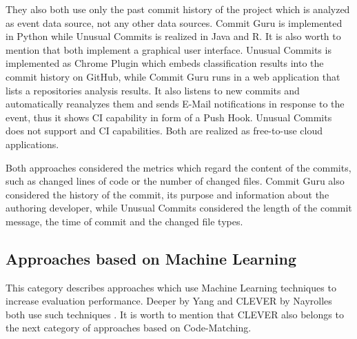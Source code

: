 They also both use only the past commit history of the project which is analyzed as event data source, not any other data sources. Commit Guru is implemented in Python while Unusual Commits is realized in Java and R. It is also worth to mention that both implement a graphical user interface. Unusual Commits is implemented as Chrome Plugin which embeds classification results into the commit history on GitHub, while Commit Guru runs in a web application that lists a repositories analysis results. It also listens to new commits and automatically reanalyzes them and sends E-Mail notifications in response to the event, thus it shows CI capability in form of a Push Hook. Unusual Commits does not support and CI capabilities. Both are realized as free-to-use cloud applications. \cite{Rosen2015,Goyal2017}

Both approaches considered the metrics which regard the content of the commits, such as changed lines of code or the number of changed files. Commit Guru also considered the history of the commit, its purpose and information about the authoring developer, while Unusual Commits considered the length of the commit message, the time of commit and the changed file types. \cite{Rosen2015,Goyal2017}


\subsection{Approaches based on Machine Learning}


This category describes approaches which use Machine Learning techniques to increase evaluation performance. Deeper by Yang and CLEVER by Nayrolles both use such techniques \cite{Nayrolles2018, Yang2015}. It is worth to mention that CLEVER also belongs to the next category of approaches based on Code-Matching.

